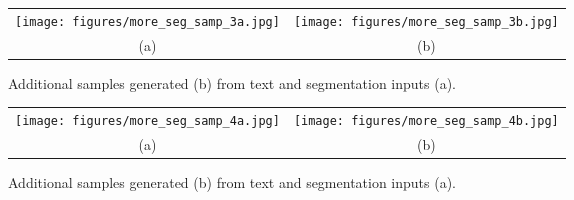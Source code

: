 \documentclass[final]{cvpr}
\begin{document}
\begin{figure*}[t]
    \centering
    \begin{tabular}{cc}
    \texttt{[image: figures/more\_seg\_samp\_3a.jpg]} & \texttt{[image: figures/more\_seg\_samp\_3b.jpg]} \\
        (a) & (b) 
    \end{tabular}
    \caption{Additional samples generated (b) from text and segmentation inputs (a).}
    \label{fig:more_seg_samples_3}
\end{figure*}

\begin{figure*}[t]
    \centering
    \begin{tabular}{cc}
    \texttt{[image: figures/more\_seg\_samp\_4a.jpg]} & \texttt{[image: figures/more\_seg\_samp\_4b.jpg]} \\
        (a) & (b) 
    \end{tabular}
    \caption{Additional samples generated (b) from text and segmentation inputs (a).}
    \label{fig:more_seg_samples_4}
\end{figure*}
\end{document}
